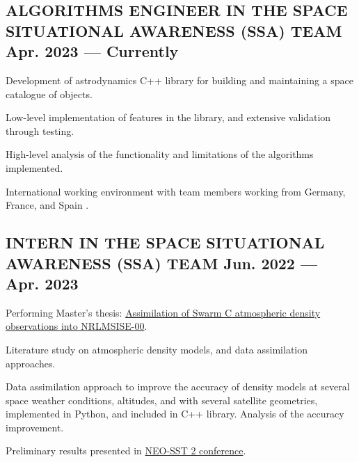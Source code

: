 \documentclass[letter,10pt]{article}
\begin{document}
\subsection{{ALGORITHMS ENGINEER IN THE SPACE SITUATIONAL AWARENESS (SSA) TEAM \hfill Apr. 2023  --- Currently}}
\begin{zitemize}
\item Development of astrodynamics C++ library for building and maintaining a space catalogue of objects.
\begin{zitemize}
    \item Low-level implementation of features in the library, and extensive validation through testing.
    \item High-level analysis of the functionality and limitations of the algorithms implemented.
    \item International working environment with team members working from Germany, France, and Spain .
\end{zitemize}
\end{zitemize}
\subsection{{INTERN IN THE SPACE SITUATIONAL AWARENESS (SSA) TEAM \hfill Jun. 2022  --- Apr. 2023}}
\begin{zitemize}
\item Performing Master's thesis: \href{https://repository.tudelft.nl/islandora/object/uuid:f472201e-0e32-4b9e-8aa3-04521908396a}{Assimilation of Swarm C atmospheric density observations into NRLMSISE-00}.
\begin{zitemize}
    \item Literature study on atmospheric density models, and data assimilation approaches.
    \item Data assimilation approach to improve the accuracy of density models at several space weather conditions, altitudes, and with several satellite geometries, implemented in Python, and included in C++ library. Analysis of the accuracy improvement.
    \item Preliminary results presented in \href{https://conference.sdo.esoc.esa.int/proceedings/neosst2/paper/90/NEOSST2-paper90.pdf}{NEO-SST 2 conference}.
\end{zitemize}
\end{zitemize}
\end{document}
